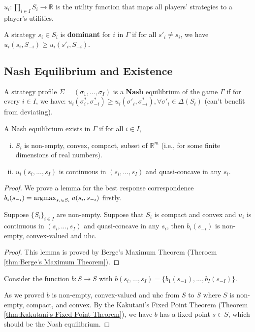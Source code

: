 \documentclass[11pt]{elegantbook}
\newcommand{\argmax}{\operatornamewithlimits{argmax}}
\begin{document}
$u_i:\prod_{i\in I}S_i \rightarrow \mathbb{R}$ is the utility function that maps all players' strategies to a player's utilities.

\begin{definition}
    \normalfont
    A strategy $s_i\in S_i$ is \textbf{dominant} for $i$ in $\Gamma$ if for all $s'_i\neq s_i$, we have $u_i(s_i,S_{-i})\geq u_i(s'_i,S_{-i})$.
\end{definition}

\subsection{Nash Equilibrium and Existence}
\begin{definition}
    \normalfont
    A strategy profile $\Sigma=(\sigma_1,...,\sigma_I)$ is a \textbf{Nash} equilibrium of the game $\Gamma$ if for every $i\in I$, we have: $u_i(\sigma^*_i,\sigma^*_{-i})\geq u_i(\sigma'_i,\sigma^*_{-i}), \forall \sigma'_i\in \Delta(S_i)$ (can't benefit from deviating).
\end{definition}

\begin{theorem}
    A Nash equilibrium exists in $\Gamma$ if for all $i\in I$,
    \begin{enumerate}[(i).]
        \item $S_i$ is non-empty, convex, compact, subset of $\mathbb{R}^m$ (i.e., for some finite dimensions of real numbers).
        \item $u_i(s_i,...,s_I)$ is continuous in $(s_i,...,s_I)$ and quasi-concave in any $s_i$.
    \end{enumerate}
\end{theorem}
\begin{proof}
    We prove a lemma for the best response correspondence $b_i(s_{-i})=\argmax_{s_i\in S_i}u(s_i,s_{-i})$ firstly.
    \begin{lemma}
        Suppose $\{S_i\}_{i\in I}$ are non-empty. Suppose that $S_i$ is compact and convex and $u_i$ is continuous in $(s_i,...,s_I)$ and quasi-concave in any $s_i$, then $b_i(s_{-i})$ is non-empty, convex-valued and uhc.
    \end{lemma}
    \begin{proof}
        This lemma is proved by Berge's Maximum Theorem (Theroem \ref{thm:Berge's Maximum Theorem}).
    \end{proof}
    Consider the function $b: S \rightarrow S$ with $b(s_i,...,s_I)=\{b_1(s_{-1}),...,b_I(s_{-I})\}$.

    As we proved $b$ is non-empty, convex-valued and uhc from $S$ to $S$ where $S$ is non-empty, compact, and convex. By the Kakutani's Fixed Point Theorem (Theorem \ref{thm:Kakutani's Fixed Point Theorem}), we have $b$ has a fixed point $s\in S$, which should be the Nash equilibrium.
\end{proof}
\end{document}
